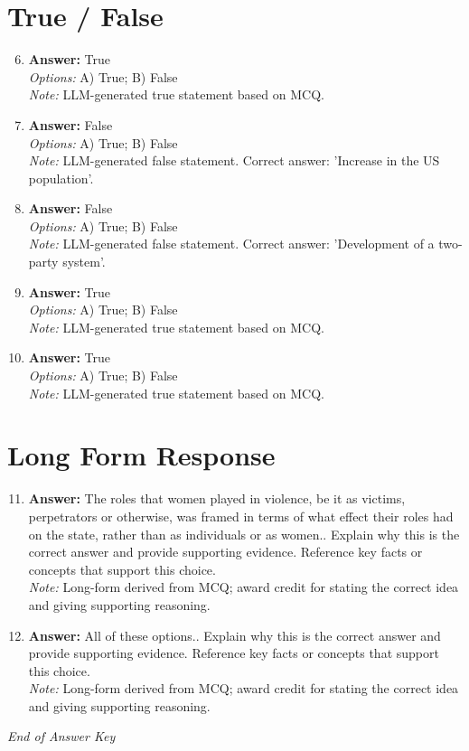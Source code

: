 \documentclass[12pt]{article}
\begin{document}
\section*{True / False}
\begin{enumerate}[label=\arabic*.]
\setcounter{enumi}{5}
\item \textbf{Answer:} True
\\ \textit{Options:} A) True; B) False
\\ \textit{Note:} LLM-generated true statement based on MCQ.
\item \textbf{Answer:} False
\\ \textit{Options:} A) True; B) False
\\ \textit{Note:} LLM-generated false statement. Correct answer: 'Increase in the US population'.
\item \textbf{Answer:} False
\\ \textit{Options:} A) True; B) False
\\ \textit{Note:} LLM-generated false statement. Correct answer: 'Development of a two-party system'.
\item \textbf{Answer:} True
\\ \textit{Options:} A) True; B) False
\\ \textit{Note:} LLM-generated true statement based on MCQ.
\item \textbf{Answer:} True
\\ \textit{Options:} A) True; B) False
\\ \textit{Note:} LLM-generated true statement based on MCQ.
\end{enumerate}

\section*{Long Form Response}
\begin{enumerate}[label=\arabic*.]
\setcounter{enumi}{10}
\item \textbf{Answer:} The roles that women played in violence, be it as victims, perpetrators or otherwise, was framed in terms of what effect their roles had on the state, rather than as individuals or as women.. Explain why this is the correct answer and provide supporting evidence. Reference key facts or concepts that support this choice.
\\ \textit{Note:} Long-form derived from MCQ; award credit for stating the correct idea and giving supporting reasoning.
\item \textbf{Answer:} All of these options.. Explain why this is the correct answer and provide supporting evidence. Reference key facts or concepts that support this choice.
\\ \textit{Note:} Long-form derived from MCQ; award credit for stating the correct idea and giving supporting reasoning.
\end{enumerate}

\vfill
\noindent\textit{End of Answer Key}
\end{document}

